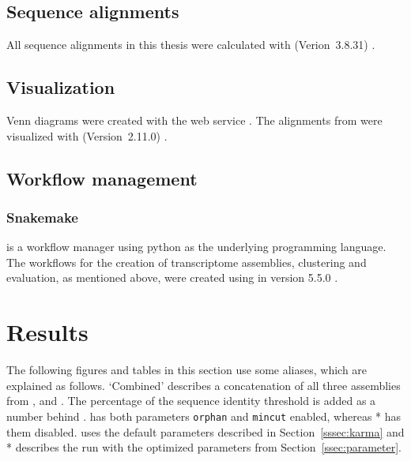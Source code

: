 \documentclass[12pt,a4paper,english]{article}
\begin{document}
	\subsection{Sequence alignments}
	All sequence alignments in this thesis were calculated with \muscle (Verion~3.8.31) \citep{muscle:04}.
	
	\subsection{Visualization}
	Venn diagrams were created with the \intervene web service \citep{intervene:17}. The alignments from \muscle were visualized with \jalview (Version~2.11.0) \citep{jalview:09}.
	
	\subsection{Workflow management}
	\subsubsection*{Snakemake}
	\snakemake is a workflow manager using python as the underlying programming language. The workflows for the creation of transcriptome assemblies, clustering and evaluation, as mentioned above, were created using \snakemake in version 5.5.0 \citep{Snakemake:12}.


\newpage
\section{Results}
	\label{sec:results}
	
	The following figures and tables in this section use some aliases, which are explained as follows. `Combined' describes a concatenation of all three assemblies from \spades, \soap and \trinity. The percentage of the sequence identity threshold is added as a number behind \cdhit. \grouper has both parameters \texttt{orphan} and \texttt{mincut} enabled, whereas \grouper{}* has them disabled.
	\karma uses the default parameters described in Section~\ref{sssec:karma} and \karma{}* describes the run with the optimized parameters from Section~\ref{ssec:parameter}.
	
\end{document}
